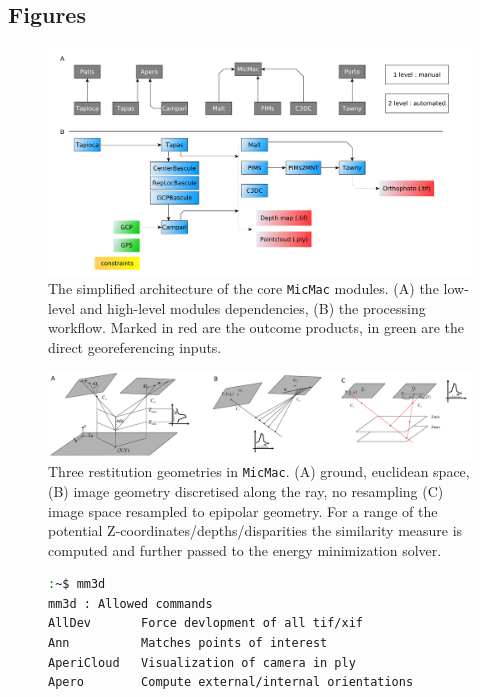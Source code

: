 \documentclass[twocolumn]{bmcart}%
\begin{document}
\begin{backmatter}

\section*{Figures}
%
\begin{figure}
\includegraphics[width=2\linewidth]{img/architecture.pdf}\caption{The simplified architecture of the core {\tt MicMac} modules. (A) the low-level and high-level modules dependencies, (B) the processing workflow. Marked in red are the outcome products, in green are the direct georeferencing inputs. }\label{fig:architecture}
\end{figure}
% 
\begin{figure}
\includegraphics[width=2\linewidth]{img/DIM_scenarios.pdf}\caption{Three restitution geometries in {\tt MicMac}. (A) ground, euclidean space, (B) image geometry discretised along the ray, no resampling (C) image space resampled to epipolar geometry. For a range of the potential Z-coordinates/depths/disparities the similarity measure is computed and further passed to the energy minimization solver.}\label{fig:matchGeom}
\end{figure}
% 
\footnotesize
\begin{figure}[h!]
\begin{lstlisting}[language=bash,frame=none]
:~$ mm3d
mm3d : Allowed commands 
AllDev		 Force devlopment of all tif/xif
Ann	 		 Matches points of interest
AperiCloud	 Visualization of camera in ply
Apero	 	 Compute external/internal orientations

\end{lstlisting}
\end{figure}
\end{backmatter}
\end{document}
